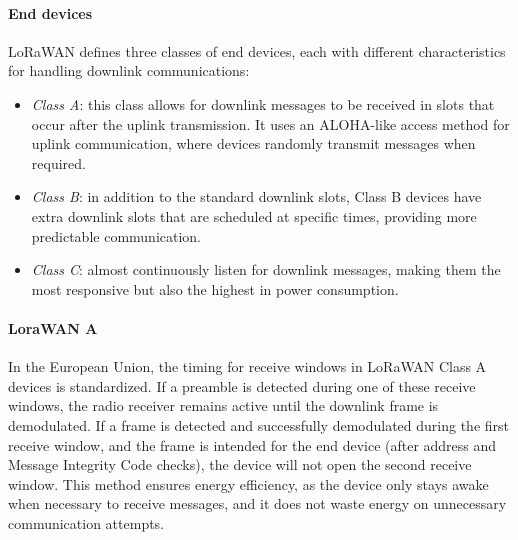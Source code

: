 \paragraph*{End devices}
LoRaWAN defines three classes of end devices, each with different characteristics for handling downlink communications:
\begin{itemize}
    \item \textit{Class A}: this class allows for downlink messages to be received in slots that occur after the uplink transmission. 
        It uses an ALOHA-like access method for uplink communication, where devices randomly transmit messages when required.
    \item \textit{Class B}: in addition to the standard downlink slots, Class B devices have extra downlink slots that are scheduled at specific times, providing more predictable communication.
    \item \textit{Class C}: almost continuously listen for downlink messages, making them the most responsive but also the highest in power consumption.
\end{itemize}

\paragraph*{LoraWAN A}
In the European Union, the timing for receive windows in LoRaWAN Class A devices is standardized. 
If a preamble is detected during one of these receive windows, the radio receiver remains active until the downlink frame is demodulated. 
If a frame is detected and successfully demodulated during the first receive window, and the frame is intended for the end device (after address and Message Integrity Code checks), the device will not open the second receive window.
This method ensures energy efficiency, as the device only stays awake when necessary to receive messages, and it does not waste energy on unnecessary communication attempts.


